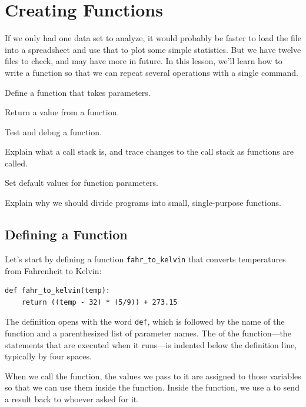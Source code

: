\documentclass{book}
\begin{document}
\section{Creating Functions}

If we only had one data set to analyze, it would probably be faster to
load the file into a spreadsheet and use that to plot some simple
statistics. But we have twelve files to check, and may have more in
future. In this lesson, we'll learn how to write a function so that we
can repeat several operations with a single command.

\begin{objectives}
\begin{swcitemize}
\item
  Define a function that takes parameters.
\item
  Return a value from a function.
\item
  Test and debug a function.
\item
  Explain what a call stack is, and trace changes to the call stack as
  functions are called.
\item
  Set default values for function parameters.
\item
  Explain why we should divide programs into small, single-purpose
  functions.
\end{swcitemize}
\end{objectives}

\subsection{Defining a Function}

Let's start by defining a function \texttt{fahr\_to\_kelvin} that
converts temperatures from Fahrenheit to Kelvin:

\begin{verbatim}
def fahr_to_kelvin(temp):
    return ((temp - 32) * (5/9)) + 273.15
\end{verbatim}

The definition opens with the word \texttt{def}, which is followed by
the name of the function and a parenthesized list of parameter names.
The  of the function---the statements
that are executed when it runs---is indented below the definition line,
typically by four spaces.

When we call the function, the values we pass to it are assigned to
those variables so that we can use them inside the function. Inside the
function, we use a  to
send a result back to whoever asked for it.
\end{document}
